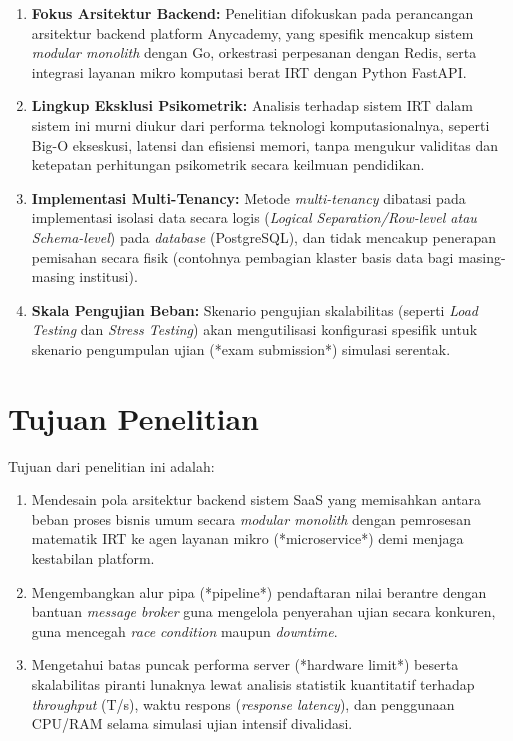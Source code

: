 \begin{enumerate}
	\item \textbf{Fokus Arsitektur Backend:} Penelitian difokuskan pada perancangan arsitektur backend platform Anycademy, yang spesifik mencakup sistem \textit{modular monolith} dengan Go, orkestrasi perpesanan dengan Redis, serta integrasi layanan mikro komputasi berat IRT dengan Python FastAPI.
	\item \textbf{Lingkup Eksklusi Psikometrik:} Analisis terhadap sistem IRT dalam sistem ini murni diukur dari performa teknologi komputasionalnya, seperti Big-O ekseskusi, latensi dan efisiensi memori, tanpa mengukur validitas dan ketepatan perhitungan psikometrik secara keilmuan pendidikan.
	\item \textbf{Implementasi Multi-Tenancy:} Metode \textit{multi-tenancy} dibatasi pada implementasi isolasi data secara logis (\textit{Logical Separation/Row-level atau Schema-level}) pada \textit{database} (PostgreSQL), dan tidak mencakup penerapan pemisahan secara fisik (contohnya pembagian klaster basis data bagi masing-masing institusi).
	\item \textbf{Skala Pengujian Beban:} Skenario pengujian skalabilitas (seperti \textit{Load Testing} dan \textit{Stress Testing}) akan mengutilisasi konfigurasi spesifik untuk skenario pengumpulan ujian (*exam submission*) simulasi serentak.
\end{enumerate}

\section{Tujuan Penelitian}
Tujuan dari penelitian ini adalah:
\begin{enumerate}
	\item Mendesain pola arsitektur backend sistem SaaS yang memisahkan antara beban proses bisnis umum secara \textit{modular monolith} dengan pemrosesan matematik IRT ke agen layanan mikro (*microservice*) demi menjaga kestabilan platform.
	\item Mengembangkan alur pipa (*pipeline*) pendaftaran nilai berantre dengan bantuan \textit{message broker} guna mengelola penyerahan ujian secara konkuren, guna mencegah \textit{race condition} maupun \textit{downtime}.
	\item Mengetahui batas puncak performa server (*hardware limit*) beserta skalabilitas piranti lunaknya lewat analisis statistik kuantitatif terhadap \textit{throughput} (T/s), waktu respons (\textit{response latency}), dan penggunaan CPU/RAM selama simulasi ujian intensif divalidasi.
\end{enumerate}


